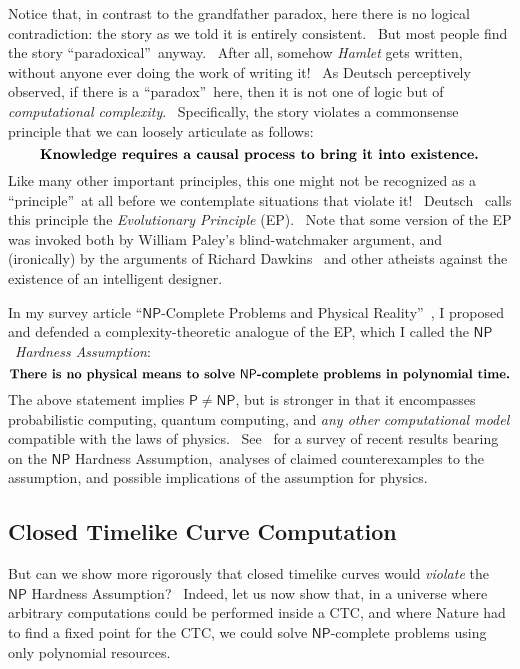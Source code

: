 \documentclass[12pt,onecolumn]{article}%
\begin{document}
Notice that, in contrast to the grandfather paradox, here there is no logical
contradiction: the story as we told it is entirely consistent. \ But most
people find the story \textquotedblleft paradoxical\textquotedblright\ anyway.
\ After all, somehow \textit{Hamlet} gets written, without anyone ever doing
the work of writing it! \ As Deutsch \cite{deutsch:ctc} perceptively observed,
if there is a \textquotedblleft paradox\textquotedblright\ here, then it is
not one of logic but of \textit{computational complexity}. \ Specifically, the
story violates a commonsense principle that we can loosely articulate as
follows:%
\[
\text{\textbf{Knowledge requires a causal process to bring it into
existence.}}%
\]
Like many other important principles, this one might not be recognized as a
\textquotedblleft principle\textquotedblright\ at all before we contemplate
situations that violate it! \ Deutsch \cite{deutsch:ctc}\ calls this principle
the \textit{Evolutionary Principle} (EP). \ Note that some version of the EP
was invoked both by William Paley's blind-watchmaker argument, and
(ironically) by the arguments of Richard Dawkins \cite{dawkins}\ and other
atheists against the existence of an intelligent designer.

In my survey article \textquotedblleft$\mathsf{NP}$-Complete Problems and
Physical Reality\textquotedblright\ \cite{aar:np}, I proposed and defended a
complexity-theoretic analogue of the EP, which I called the $\mathsf{NP}%
$\ \textit{Hardness Assumption}:%
\[
\text{\textbf{There is no physical means to solve }}\mathsf{NP}%
\text{\textbf{-complete problems in polynomial time.}}%
\]
The above statement implies $\mathsf{P}\neq\mathsf{NP}$, but is stronger in
that it encompasses probabilistic computing, quantum computing, and
\textit{any other} \textit{computational model} compatible with the laws of
physics. \ See \cite{aar:np}\ for a survey of recent results bearing on the
$\mathsf{NP}$ Hardness Assumption,\ analyses of claimed counterexamples to the
assumption, and possible implications of the assumption for physics.

\subsection{Closed Timelike Curve Computation\label{CTCCOMP}}

But can we show more rigorously that closed timelike curves would
\textit{violate} the $\mathsf{NP}$ Hardness Assumption? \ Indeed, let us now
show that, in a universe where arbitrary computations could be performed
inside a CTC, and where Nature had to find a fixed point for the CTC, we could
solve $\mathsf{NP}$-complete problems using only polynomial resources.
\end{document}

